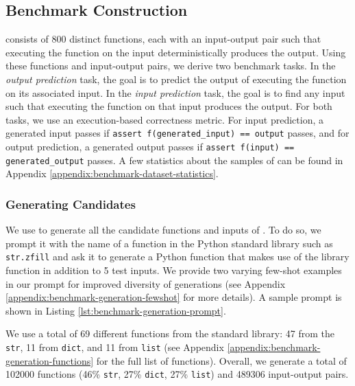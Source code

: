 
\subsection{Benchmark Construction} \label{sec:benchmark-construction}

\benchmark consists of 800 distinct functions, each with an input-output pair such that executing the function on the input deterministically produces the output. Using these functions and input-output pairs, we derive two benchmark tasks. In the \textit{output prediction} task, the goal is to predict the output of executing the function on its associated input. In the \textit{input prediction} task, the goal is to find any input such that executing the function on that input produces the output. For both tasks, we use an execution-based correctness metric. For input prediction, a generated input passes if \texttt{assert f(generated\_input) == output} passes, and for output prediction, a generated output passes if \texttt{assert f(input) == generated\_output} passes. A few statistics about the samples of \benchmark can be found in Appendix \ref{appendix:benchmark-dataset-statistics}.

\subsubsection{Generating Candidates} \label{subsec:generating-candidates}
We use \codellamalarge to generate all the candidate functions and inputs of \benchmark. To do so, we prompt it with the name of a function in the Python standard library such as \texttt{str.zfill} and ask it to generate a Python function that makes use of the library function in addition to 5 test inputs. We provide two varying few-shot examples in our prompt for improved diversity of generations (see Appendix \ref{appendix:benchmark-generation-fewshot} for more details). A sample prompt is shown in Listing \ref{lst:benchmark-generation-prompt}.

We use a total of 69 different functions from the standard library: 47 from the \texttt{str}, 11 from \texttt{dict}, and 11 from \texttt{list} (see Appendix \ref{appendix:benchmark-generation-functions} for the full list of functions). Overall, we generate a total of 102000 functions (46\% \texttt{str}, 27\% \texttt{dict}, 27\% \texttt{list}) and 489306 input-output pairs.


